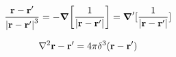 \begin{equation}
  \label{app:eqn:grad_r}
    \frac{\vb{r}-\vb{r}'}{\abs{\vb{r}-\vb{r}'}^3}=-\grad[\frac{1}{\abs{\vb{r}-\vb{r'}}}]=\grad'[\frac{1}{\abs{\vb{r}-\vb{r'}}}]
\end{equation}

\begin{equation}
  \label{app:eqn:laplacian_r}
    \laplacian{\vb{r}-\vb{r}'}=4\pi\delta^3(\vb{r}-\vb{r}')
\end{equation}

